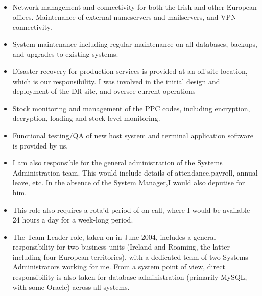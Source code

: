 \documentclass[a4paper]{tenseconds} %
\begin{document}
\begin{twenty}
{\begin{itemize}
		\item Network management and connectivity for both the Irish and other European offices. Maintenance of external nameservers and mailservers, and VPN connectivity.
		\item System maintenance including regular maintenance on all databases, backups, and upgrades to existing systems.
		\item Disaster recovery for production services is provided at an off site location, which is our responsibility. I was involved in the initial design and deployment of the DR site, and oversee current operations
		\item Stock monitoring and management of the PPC codes, including encryption, decryption, loading and stock level monitoring.
		\item Functional testing/QA of new host system and terminal application software is provided by us.
		\item I am also responsible for the general administration of the Systems Administration team. This would include details of attendance,payroll, annual leave, etc. In the absence of the System Manager,I would also deputise for him.
		\item This role also requires a rota'd period of on call, where I would be available 24 hours a day for a week-long period.
		\item The Team Leader role, taken on in June 2004, includes a general responsibility for two business units (Ireland and Roaming, the latter including four European territories), with a dedicated team of two Systems Administrators working for me. From a system point of view, direct responsibility is also taken for database administration (primarily MySQL, with some Oracle) across all systems.
		\end{itemize}}
	\\

	        
\end{twenty}
\end{document}
